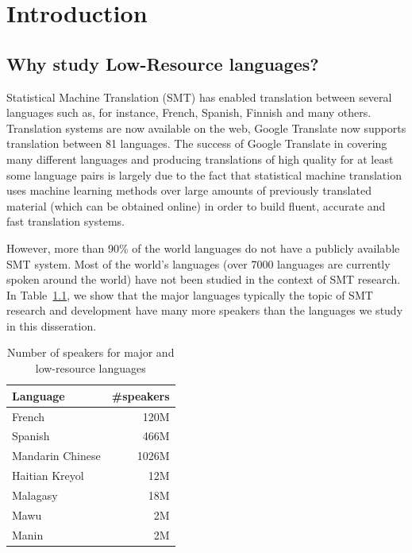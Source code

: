 
%
%

\chapter{Introduction}
\label{sec:introduction}

\section{Why study Low-Resource languages?}
\label{sec:low_resource}

Statistical Machine Translation (SMT) has enabled translation between several languages such as, for instance, French, Spanish, Finnish and many others. Translation systems are now available on the web, Google Translate now supports translation between 81 languages. The success of Google Translate in covering many different languages and producing translations of high quality for at least some language pairs is largely due to the fact that statistical machine translation uses machine learning methods over large amounts of previously translated material (which can be obtained online) in order to build fluent, accurate and fast translation systems.

However, more than 90\% of the world languages do not have a publicly available SMT system. Most of the world's languages (over 7000 languages are currently spoken around the world) have not been studied in the context of SMT research. In Table~\ref{table:numberspeakers}, we show that the major languages typically the topic of SMT research and development have many more speakers than the languages we study in this disseration. 
\begin{table}
 	 \centering
	\begin{tabular}{lr}
	\toprule
	Language & \#speakers \\
	\toprule
	French & 120M \\
	Spanish & 466M \\
	Mandarin Chinese & 1026M \\
	\midrule
	Haitian Kreyol & 12M \\
	Malagasy & 18M \\
	Mawu & 2M \\
	Manin & 2M \\
	\bottomrule
	\end{tabular}
	\caption{Number of speakers for major and low-resource languages}
	\label{table:numberspeakers}
\end{table}

